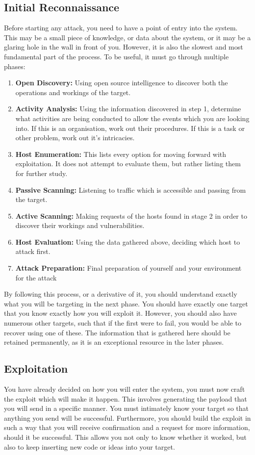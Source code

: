 		\subsection{Initial Reconnaissance}
			Before starting any attack, you need to have a point of entry into the system. 
			This may be a small piece of knowledge, or data about the system, or it may be a glaring hole in the wall in front of you. 
			However, it is also the slowest and most fundamental part of the process. 
			To be useful, it must go through multiple phases:
			\begin{enumerate}
				\item \textbf{Open Discovery:} Using open source intelligence to discover both the operations and workings of the target. 
				\item \textbf{Activity Analysis:} Using the information discovered in step 1, determine what activities are being conducted to allow the events which you are looking into. 
					If this is an organisation, work out their procedures. 
					If this is a task or other problem, work out it's intricacies. 
				\item \textbf{Host Enumeration:} This lists every option for moving forward with exploitation. 
					It does not attempt to evaluate them, but rather listing them for further study. 
				\item \textbf{Passive Scanning:} Listening to traffic which is accessible and passing from the target. 
				\item \textbf{Active Scanning:} Making requests of the hosts found in stage 2 in order to discover their workings and vulnerabilities.
				\item \textbf{Host Evaluation:} Using the data gathered above, deciding which host to attack first. 
				\item \textbf{Attack Preparation:} Final preparation of yourself and your environment for the attack
			\end{enumerate}

			By following this process, or a derivative of it, you should understand exactly what you will be targeting in the next phase. 
			You should have exactly one target that you know exactly how you will exploit it. 
			However, you should also have numerous other targets, such that if the first were to fail, you would be able to recover using one of these.
			The information that is gathered here should be retained permanently, as it is an exceptional resource in the later phases. 

		\subsection{Exploitation}
			You have already decided on how you will enter the system, you must now craft the exploit which will make it happen.
			This involves generating the payload that you will send in a specific manner. 
			You must intimately know your target so that anything you send will be successful. 
			Furthermore, you should build the exploit in such a way that you will receive confirmation and a request for more information, should it be successful. 
			This allows you not only to know whether it worked, but also to keep inserting new code or ideas into your target. 

